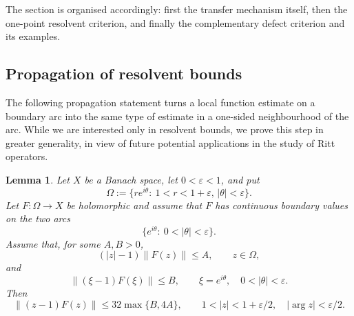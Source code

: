 \documentclass[11pt]{amsart}
\numberwithin{equation}{section}
\newtheorem{lemma}[theorem]{Lemma}
\theoremstyle{definition}
\theoremstyle{plain}
\begin{document}
The section is organised accordingly: first the transfer
mechanism itself, then the one-point resolvent criterion, and finally the complementary defect
criterion and its examples.

\subsection{Propagation of resolvent bounds}\label{subsec:Lyubich-propagation}

The following propagation statement 
turns a local function estimate on a boundary arc
into the same type of estimate in a one-sided neighbourhood of the arc.
While we are interested only in resolvent bounds,
we prove this step in greater generality,
in view of future potential applications
in the study of Ritt operators.


\begin{lemma}\label{lem:local-propagation}
Let \(X\) be a Banach space, let \(0<\varepsilon<1\), and put
\[
        \Omega
       :=
        \{re^{i\theta}:\ 1<r<1+\varepsilon,\, |\theta|<\varepsilon\}.
\]
Let \(F:\Omega\to X\) be holomorphic and assume that \(F\) has continuous
boundary values on the two arcs
\[
        \{e^{i\theta}:\ 0<|\theta|<\varepsilon\}.
\]
Assume that, for some \(A,B>0\),
\begin{equation}\label{eq:local-radial-bound}
        (|z|-1)\|F(z)\|\le A,
        \qquad z\in\Omega,
\end{equation}
and
\begin{equation}\label{eq:local-boundary-bound}
        \|(\xi-1)F(\xi)\|\le B,
        \qquad \xi=e^{i\theta},\quad 0<|\theta|<\varepsilon .
\end{equation} 
Then
\[
       \|(z-1)F(z)\|\le 32\max\{B,4A\},
        \qquad
        1<|z|<1+\varepsilon/2,\quad |\arg z|<\varepsilon/2.
\]
\end{lemma}
\end{document}
